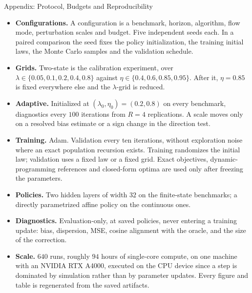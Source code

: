 \documentclass[9pt]{beamer}
\begin{document}
\begin{frame}{Appendix: Protocol, Budgets and Reproducibility}
\footnotesize
\begin{itemize}
  \item \textbf{Configurations.} A configuration is a benchmark, horizon, algorithm, flow mode, perturbation scales and budget. Five independent seeds each. In a paired comparison the seed fixes the policy initialization, the training initial laws, the Monte Carlo samples and the validation schedule.
  \item \textbf{Grids.} Two-state is the calibration experiment, over $\lambda\in\{0.05,0.1,0.2,0.4,0.8\}$ against $\eta\in\{0.4,0.6,0.85,0.95\}$. After it, $\eta=0.85$ is fixed everywhere else and the $\lambda$-grid is reduced.
  \item \textbf{Adaptive.} Initialized at $(\lambda_0,\eta_0)=(0.2,0.8)$ on every benchmark, diagnostics every $100$ iterations from $R=4$ replications. A scale moves only on a resolved bias estimate or a sign change in the direction test.
  \item \textbf{Training.} Adam. Validation every ten iterations, without exploration noise where an exact population recursion exists. Training randomizes the initial law; validation uses a fixed law or a fixed grid. Exact objectives, dynamic-programming references and closed-form optima are used only after freezing the parameters.
  \item \textbf{Policies.} Two hidden layers of width $32$ on the finite-state benchmarks; a directly parametrized affine policy on the continuous ones.
  \item \textbf{Diagnostics.} Evaluation-only, at saved policies, never entering a training update: bias, dispersion, MSE, cosine alignment with the oracle, and the size of the correction.
  \item \textbf{Scale.} $640$ runs, roughly $94$ hours of single-core compute, on one machine with an NVIDIA RTX A4000, executed on the CPU device since a step is dominated by simulation rather than by parameter updates. Every figure and table is regenerated from the saved artifacts.
\end{itemize}
\end{frame}
\end{document}
